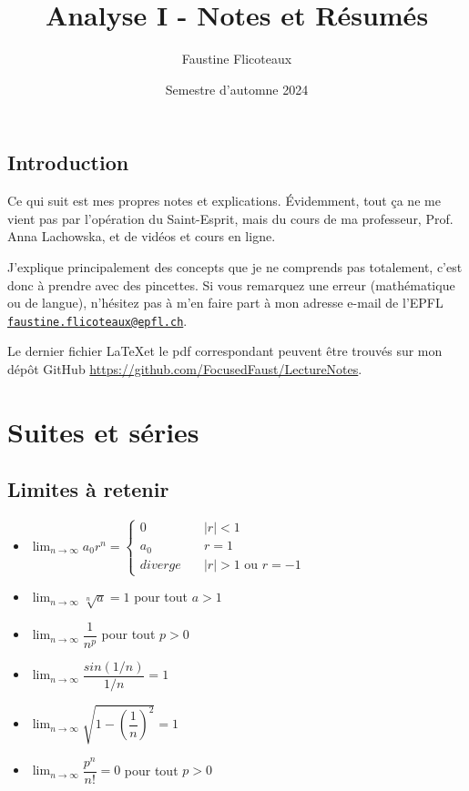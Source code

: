 \documentclass[10pt,a4paper]{book}
\title{Analyse I - Notes et Résumés}
\author{Faustine Flicoteaux}
\date{Semestre d'automne 2024}
\begin{document}
\maketitle
\tableofcontents
\newpage


\section*{Introduction}
Ce qui suit est mes propres notes et explications. Évidemment, tout ça ne me vient pas par l'opération du Saint-Esprit, mais du cours de ma professeur, Prof. Anna Lachowska, et de vidéos et cours en ligne.\par 
J'explique principalement des concepts que je ne comprends pas totalement, c'est donc à prendre avec des pincettes. Si vous remarquez une erreur (mathématique ou de langue), n'hésitez pas à m'en faire part à mon adresse e-mail de l'EPFL \texttt{\href{mailto:faustine.flicoteaux@epfl.ch}{faustine.flicoteaux@epfl.ch}}.\par 
Le dernier fichier \LaTeX et le pdf correspondant peuvent être trouvés sur mon dépôt GitHub \url{https://github.com/FocusedFaust/LectureNotes}.

\chapter{Suites et séries}
\section{Limites à retenir}
\begin{itemize}
\item $\lim_{n\to\infty} a_0r^n = \left\{
        \begin{array}{ll}
            0 & \quad |r| < 1\\
            a_0 & \quad r = 1\\
            diverge & \quad |r| > 1 \text{ ou } r = -1
        \end{array}\right.$
\item $\lim_{n\to\infty} \sqrt[n]{a} = 1$ pour tout $a > 1$
\item $\lim_{n\to\infty} \dfrac{1}{n^p}$ pour tout $p > 0$
\item $\lim_{n\to\infty} \dfrac{sin(1/n)}{1/n} = 1$
\item $\lim_{n\to\infty} \sqrt{1-(\dfrac{1}{n})^2} = 1$
\item $\lim_{n\to\infty} \dfrac{p^n}{n!} = 0$ pour tout $p > 0$
\end{itemize}
\end{document}

